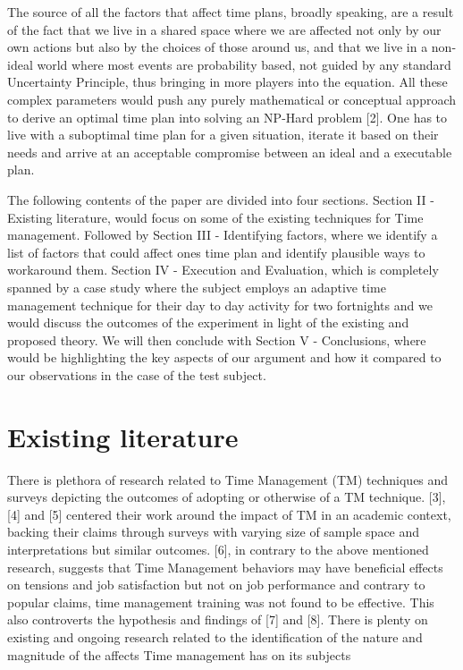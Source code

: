 \documentclass[conference]{IEEEtran}
\begin{document}
The source of all the factors that affect time plans, broadly speaking, are a result of the fact that we live in a shared space where we are affected not only by our own actions but also by the choices of those around us, and that we live in a non-ideal world where most events are probability based, not guided by any standard Uncertainty Principle, thus bringing in more players into the equation. All these complex parameters would push any purely mathematical or conceptual approach to derive an optimal time plan into solving an NP-Hard problem [2]. One has to live with a suboptimal time plan for a given situation, iterate it based on their needs and arrive at an acceptable compromise between an ideal and a executable plan.

The following contents of the paper are divided into four sections. Section II - Existing literature, would focus on some of the existing techniques for Time management. Followed by Section III - Identifying factors, where we identify a list of factors that could affect ones time plan and identify plausible ways to workaround them. Section IV - Execution and Evaluation, which is completely spanned by a case study where the subject employs an adaptive time management technique for their day to day activity for two fortnights and we would discuss the outcomes of the experiment in light of the existing and proposed theory. We will then conclude with Section V - Conclusions, where would be highlighting the key aspects of our argument and how it compared to our observations in the case of the test subject.

\section{Existing literature}
There is plethora of research related to Time Management (TM) techniques and surveys depicting the outcomes of adopting or otherwise of a TM technique. [3], [4] and [5] centered their work around the impact of TM in an academic context, backing their claims through surveys with varying size of sample space and interpretations but similar outcomes. [6], in contrary to the above mentioned research, suggests that Time Management behaviors may have beneficial effects on tensions and job satisfaction but not on job performance and contrary to popular claims, time management training was not found to be effective. This also controverts the hypothesis and findings of [7] and [8]. There is plenty on existing and ongoing research related to the identification of the nature and magnitude of the affects Time management has on its subjects  
\end{document}
